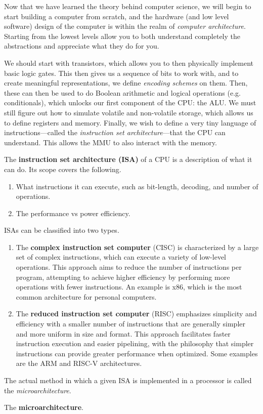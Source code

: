 Now that we have learned the theory behind computer science, we will begin to start building a computer from scratch, and the hardware (and low level software) design of the computer is within the realm of \textit{computer architecture}. Starting from the lowest levels allow you to both understand completely the abstractions and appreciate what they do for you. 

We should start with transistors, which allows you to then physically implement basic logic gates. This then gives us a sequence of bits to work with, and to create meaningful representations, we define \textit{encoding schemes} on them. Then, these can then be used to do Boolean arithmetic and logical operations (e.g. conditionals), which unlocks our first component of the CPU: the ALU. We must still figure out how to simulate volatile and non-volatile storage, which allows us to define registers and memory. Finally, we wish to define a very tiny language of instructions---called the \textit{instruction set architecture}---that the CPU can understand. This allows the MMU to also interact with the memory. 

\begin{definition}
  \label{def:instruction-set-architecture}
  The \textbf{instruction set architecture (ISA)} of a CPU is a description of what it can do. Its scope covers the following. 
  \begin{enumerate} 
    \item What instructions it can execute, such as bit-length, decoding, and number of operations. 
    \item The performance vs power efficiency. 
  \end{enumerate}
\end{definition}

\begin{example}[]
  \label{ex:complex-instruction-set-computer}
  ISAs can be classified into two types. 
  \begin{enumerate} 
    \item The \textbf{complex instruction set computer} (CISC) is characterized by a large set of complex instructions, which can execute a variety of low-level operations. This approach aims to reduce the number of instructions per program, attempting to achieve higher efficiency by performing more operations with fewer instructions. An example is x86, which is the most common architecture for personal computers.  
    \item The \textbf{reduced instruction set computer} (RISC) emphasizes simplicity and efficiency with a smaller number of instructions that are generally simpler and more uniform in size and format. This approach facilitates faster instruction execution and easier pipelining, with the philosophy that simpler instructions can provide greater performance when optimized. Some examples are the ARM and RISC-V architectures. 
  \end{enumerate}
\end{example}

The actual method in which a given ISA is implemented in a processor is called the \textit{microarchitecture}. 

\begin{definition}[Microarchitecture]
  \label{def:microarchitecture}
  The \textbf{microarchitecture}. 
\end{definition}

